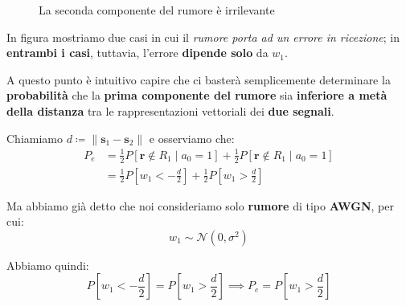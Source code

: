 \begin{figure}[!ht]
    \caption{La seconda componente del rumore è irrilevante}
\end{figure}

\begin{remark}
    In figura mostriamo due casi in cui il \textit{rumore porta ad un errore in ricezione};
    in \textbf{entrambi i casi}, tuttavia, l'errore \textbf{dipende solo} da $w_{1}$.
\end{remark}

A questo punto è intuitivo capire che ci basterà semplicemente determinare la \textbf{probabilità} 
che la \textbf{prima componente del rumore} sia \textbf{inferiore a metà della distanza} 
tra le rappresentazioni vettoriali dei \textbf{due segnali}.

Chiamiamo $d\coloneqq \|\mathbf{s}_{1} - \mathbf{s}_{2}\|$ e osserviamo che:
\[
    \begin{aligned}
        P_e &= \frac{1}{2} P[\mathbf{r} \not\in R_{1} \;|\; a_{0} = 1] + 
            \frac{1}{2} P[\mathbf{r} \not\in R_{1} \;|\; a_{0} = 1] \\ 
            &= \frac{1}{2} P \left[ w_{1} < -\frac{d}{2} \right] + 
            \frac{1}{2} P \left[ w_{1} > \frac{d}{2} \right]
    \end{aligned}
\]

Ma abbiamo già detto che noi consideriamo solo \textbf{rumore} di tipo \textbf{AWGN},
per cui:
\[
    w_{1} \sim \mathcal{N}(0, \sigma^2)
\]

Abbiamo quindi:
\[
    P \left[ w_{1} < -\frac{d}{2} \right] = P \left[ w_{1} > \frac{d}{2} \right] 
    \implies P_e = P \left[ w_{1} > \frac{d}{2} \right]
\]

